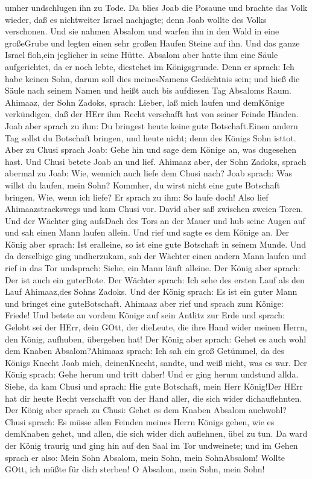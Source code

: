 umher undschlugen ihn zu Tode.  Da blies Joab die Posaune
und brachte das Volk wieder, daß es nichtweiter Israel nachjagte; denn
Joab wollte des Volks verschonen.  Und sie nahmen Absalom
und warfen ihn in den Wald in eine großeGrube und legten einen sehr
großen Haufen Steine auf ihn. Und das ganze Israel floh,ein jeglicher in
seine Hütte.  Absalom aber hatte ihm eine Säule
aufgerichtet, da er noch lebte, diestehet im Königsgrunde. Denn er
sprach: Ich habe keinen Sohn, darum soll dies meinesNamens Gedächtnis
sein; und hieß die Säule nach seinem Namen und heißt auch bis aufdiesen
Tag Absaloms Raum.  Ahimaaz, der Sohn Zadoks, sprach:
Lieber, laß mich laufen und demKönige verkündigen, daß der HErr ihm
Recht verschafft hat von seiner Feinde Händen.  Joab aber
sprach zu ihm: Du bringest heute keine gute Botschaft.Einen andern Tag
sollst du Botschaft bringen, und heute nicht; denn des Königs Sohn
isttot.  Aber zu Chusi sprach Joab: Gehe hin und sage dem
Könige an, was dugesehen hast. Und Chusi betete Joab an und lief.
 Ahimaaz aber, der Sohn Zadoks, sprach abermal zu Joab:
Wie, wennich auch liefe dem Chusi nach? Joab sprach: Was willst du
laufen, mein Sohn? Kommher, du wirst nicht eine gute Botschaft bringen.
 Wie, wenn ich liefe? Er sprach zu ihm: So laufe doch! Also
lief Ahimaazstrackswegs und kam Chusi vor.  David aber saß
zwischen zweien Toren. Und der Wächter ging aufsDach des Tors an der
Mauer und hub seine Augen auf und sah einen Mann laufen allein.
 Und rief und sagte es dem Könige an. Der König aber
sprach: Ist eralleine, so ist eine gute Botschaft in seinem Munde. Und
da derselbige ging undherzukam,  sah der Wächter einen
andern Mann laufen und rief in das Tor undsprach: Siehe, ein Mann läuft
alleine. Der König aber sprach: Der ist auch ein guterBote.
 Der Wächter sprach: Ich sehe des ersten Lauf als den Lauf
Ahimaaz,des Sohns Zadoks. Und der König sprach: Es ist ein guter Mann
und bringet eine guteBotschaft.  Ahimaaz aber rief und
sprach zum Könige: Friede! Und betete an vordem Könige auf sein Antlitz
zur Erde und sprach: Gelobt sei der HErr, dein GOtt, der dieLeute, die
ihre Hand wider meinen Herrn, den König, aufhuben, übergeben hat!
 Der König aber sprach: Gehet es auch wohl dem Knaben
Absalom?Ahimaaz sprach: Ich sah ein groß Getümmel, da des Königs Knecht
Joab mich, deinenKnecht, sandte, und weiß nicht, was es war.
 Der König sprach: Gehe herum und tritt daher! Und er ging
herum undstund allda.  Siehe, da kam Chusi und sprach: Hie
gute Botschaft, mein Herr König!Der HErr hat dir heute Recht verschafft
von der Hand aller, die sich wider dichauflehnten.  Der
König aber sprach zu Chusi: Gehet es dem Knaben Absalom auchwohl? Chusi
sprach: Es müsse allen Feinden meines Herrn Königs gehen, wie es
demKnaben gehet, und allen, die sich wider dich auflehnen, übel zu tun.
 Da ward der König traurig und ging hin auf den Saal im Tor
undweinete; und im Gehen sprach er also: Mein Sohn Absalom, mein Sohn,
mein SohnAbsalom! Wollte GOtt, ich müßte für dich sterben! O Absalom,
mein Sohn, mein Sohn!

